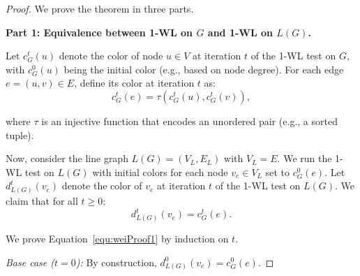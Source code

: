 \documentclass[pdflatex,sn-mathphys-num]{sn-jnl}%
\theoremstyle{thmstyleone}%
\theoremstyle{thmstyletwo}%
\theoremstyle{thmstylethree}%
\theoremstyle{plain} %
\theoremstyle{definition} %
\theoremstyle{remark} %
\theoremstyle{plain} %
\begin{document}
\begin{proof}
We prove the theorem in three parts.

\noindent\textbf{Part 1: Equivalence between 1-WL on $G$ and 1-WL on $L(G)$.}

Let $c^t_G(u)$ denote the color of node $u \in V$ at iteration $t$ of the 1-WL test on $G$, with $c^0_G(u)$ being the initial color (e.g., based on node degree). For each edge $e = (u, v) \in E$, define its color at iteration $t$ as:
\begin{equation}
    c^t_G(e) = \tau\left(c^t_G(u), c^t_G(v)\right),
\end{equation}


where $\tau$ is an injective function that encodes an unordered pair (e.g., a sorted tuple).

Now, consider the line graph $L(G) = (V_L, E_L)$ with $V_L = E$. We run the 1-WL test on $L(G)$ with initial colors for each node $v_e \in V_L$ set to $c^0_G(e)$. Let $d^t_{L(G)}(v_e)$ denote the color of $v_e$ at iteration $t$ of the 1-WL test on $L(G)$. We claim that for all $t \geq 0$:
\begin{equation}
d^t_{L(G)}(v_e) = c^t_G(e). 
\label{equ:weiProof1}
\end{equation}

    

We prove Equation~\ref{equ:weiProof1} by induction on $t$.

\textit{Base case ($t=0$):} By construction, $d^0_{L(G)}(v_e) = c^0_G(e)$.


\end{proof}
\end{document}
